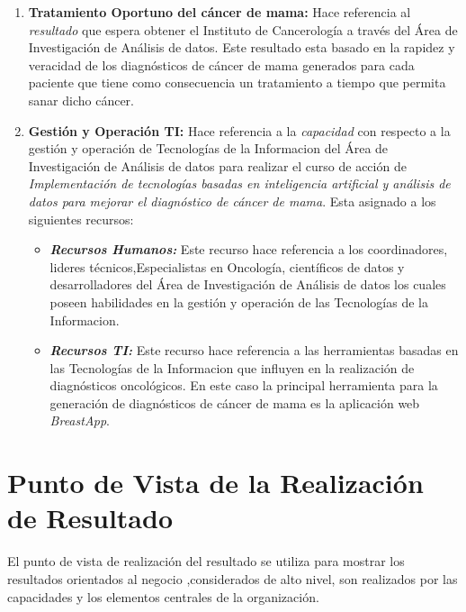 \begin{enumerate}[label=\textbf{\arabic*})]
	
\item  \textbf{Tratamiento Oportuno del cáncer de mama:} Hace referencia al \textit{resultado} que espera obtener el Instituto de Cancerología a través del Área de Investigación de Análisis de datos. Este resultado esta basado en la rapidez y veracidad de los diagnósticos de cáncer de mama generados para cada paciente que tiene como consecuencia un tratamiento a tiempo que permita sanar dicho cáncer.

\newpage
\item  \textbf{Gestión y Operación TI:} Hace referencia a la \textit{capacidad} con respecto a la gestión y operación de Tecnologías de  la Informacion del Área de Investigación de Análisis de datos para realizar el curso de acción de \textit{Implementación de tecnologías basadas en  inteligencia artificial y análisis de datos para 	mejorar  el diagnóstico de cáncer de mama}. Esta asignado a los siguientes recursos:
	
	\begin{itemize}
		\item  \textbf{\textit{Recursos Humanos:}} Este recurso hace referencia a los coordinadores, lideres técnicos,Especialistas en Oncología, científicos de datos  y desarrolladores del Área de Investigación de Análisis de datos los cuales poseen habilidades en la gestión y operación de las Tecnologías de la Informacion.
		
		\item  \textbf{\textit{Recursos TI:}} Este recurso hace referencia a las herramientas basadas en las Tecnologías de la Informacion que influyen en la realización de diagnósticos oncológicos. En este caso la principal herramienta para la generación de diagnósticos de cáncer de mama es la aplicación web \textit{BreastApp}.
	\end{itemize}
	
\end{enumerate}

\newpage
\section{Punto de Vista de la Realización de Resultado}

El punto de vista de realización del resultado se utiliza para mostrar los resultados orientados al negocio ,considerados de alto nivel, son realizados por las capacidades y los elementos centrales de la organización\cite{ArchiMate3.0.1}. 

